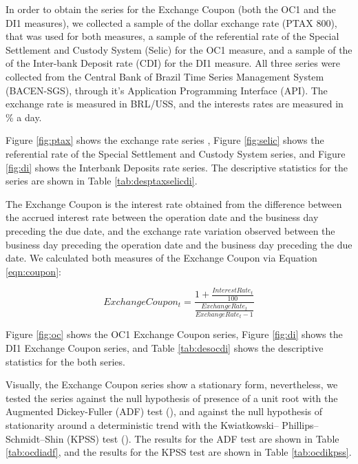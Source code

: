 \documentclass[a4paper]{article}
\begin{document}
In order to obtain the series for the Exchange Coupon (both the OC1 and the DI1 measures), we collected a sample of the dollar exchange rate (PTAX 800), that was used for both measures, a sample of the referential rate of the Special Settlement and Custody System (Selic) for the OC1 measure, and a sample of the of the Inter-bank Deposit rate (CDI) for the DI1 measure. All three series were collected from the Central Bank of Brazil Time Series Management System (BACEN-SGS), through it's Application Programming Interface (API). The exchange rate is measured in BRL/USS, and the interests rates are measured in \% a day.

Figure \ref{fig:ptax} shows the exchange rate series , Figure \ref{fig:selic} shows the referential rate of the Special Settlement and Custody System series, and Figure \ref{fig:di} shows the Interbank Deposits rate series. The descriptive statistics for the series are shown in Table \ref{tab:desptaxselicdi}.











The Exchange Coupon is the interest rate obtained from the difference between the accrued interest rate between the operation date and the business day preceding the due date, and the exchange rate variation observed between the business day preceding the operation date and the business day preceding the due date. We calculated both measures of the Exchange Coupon via Equation \ref{eqn:coupon}:

\begin{equation}
\label{eqn:coupon}
ExchangeCoupon_t = \frac{1 + \frac{InterestRate_t}{100}}{\frac{ExchangeRate_t}{ExchangeRate_t-1}}
\end{equation}

Figure \ref{fig:oc} shows the OC1 Exchange Coupon series, Figure \ref{fig:di} shows the DI1 Exchange Coupon series, and Table \ref{tab:desocdi} shows the descriptive statistics for the both series.







Visually, the Exchange Coupon series show a stationary form, nevertheless, we tested the series against the null hypothesis of presence of a unit root with the Augmented Dickey-Fuller (ADF) test (\citet{adf}), and against the null hypothesis of stationarity around a deterministic trend with the Kwiatkowski– Phillips–Schmidt–Shin (KPSS) test (\citet{kpss}). The results for the ADF test are shown in Table \ref{tab:ocdiadf}, and the results for the KPSS test are shown in Table \ref{tab:ocdikpss}.
\end{document}
